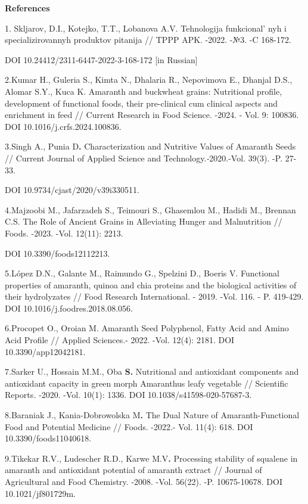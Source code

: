 {{\bfseries References}

1. Skljarov, D.I., Kotejko, T.T., Lobanova A.V. Tehnologija
funkcional' nyh i specializirovannyh produktov pitanija
// TPPP APK. -2022. -№3. -C 168-172.

DOI 10.24412/2311-6447-2022-3-168-172 {[}in Russian{]}

2.Kumar H., Guleria S., Kimta N., Dhalaria R., Nepovimova E., Dhanjal
D.S., Alomar S.Y., Kuca K. Amaranth and buckwheat grains: Nutritional
profile, development of functional foods, their pre-clinical cum
clinical aspects and enrichment in feed // Current Research in Food
Science. -2024. - Vol. 9: 100836. DOI 10.1016/j.crfs.2024.100836.

3.Singh A., Punia D{\bfseries .} Characterization and Nutritive Values of
Amaranth Seeds // Current Journal of Applied Science and
Technology.\emph{-}2020.-Vol. 39(3). -P. 27-33.

DOI 10.9734/cjast/2020/v39i330511.

4.Majzoobi M., Jafarzadeh S., Teimouri S., Ghasemlou M., Hadidi M.,
Brennan C.S. The Role of Ancient Grains in Alleviating Hunger and
Malnutrition // Foods. -2023. -Vol. 12(11): 2213.

DOI 10.3390/foods12112213.

5.López D.N., Galante M., Raimundo G., Spelzini D., Boeris V. Functional
properties of amaranth, quinoa and chia proteins and the biological
activities of their hydrolyzates // Food Research International. - 2019.
-Vol. 116. - P. 419-429. DOI 10.1016/j.foodres.2018.08.056.

6.Procopet O., Oroian M. Amaranth Seed Polyphenol, Fatty Acid and Amino
Acid Profile // Applied Sciences.- 2022. -Vol. 12(4): 2181. DOI
10.3390/app12042181.

7.Sarker U., Hossain M.M., Oba {\bfseries S.} Nutritional and antioxidant
components and antioxidant capacity in green morph Amaranthus leafy
vegetable // Scientific Reports\emph{.} -2020. -Vol. 10(1): 1336. DOI
10.1038/s41598-020-57687-3.

8.Baraniak J., Kania-Dobrowolska M{\bfseries .} The Dual Nature of
Amaranth-Functional Food and Potential Medicine // Foods. -2022.- Vol.
11(4): 618. DOI 10.3390/foods11040618.

9.Tikekar R.V., Ludescher R.D., Karwe M.V{\bfseries .} Processing stability
of squalene in amaranth and antioxidant potential of amaranth extract //
Journal of Agricultural and Food Chemistry. -2008. -Vol. 56(22). -P.
10675-10678. DOI 10.1021/jf801729m.

}
